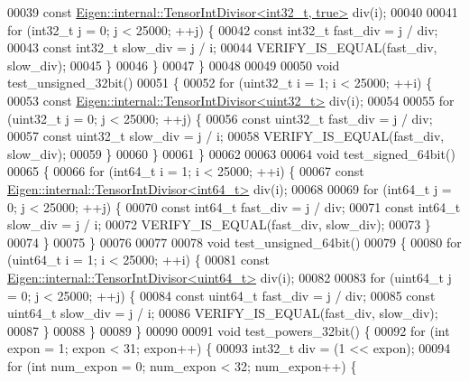 \begin{DoxyCode}
00039     \textcolor{keyword}{const} \hyperlink{class_eigen_1_1internal_1_1_tensor_int_divisor_3_01int32__t_00_01true_01_4}{Eigen::internal::TensorIntDivisor<int32\_t, true>} 
      div(i);
00040 
00041     \textcolor{keywordflow}{for} (int32\_t j = 0; j < 25000; ++j) \{
00042       \textcolor{keyword}{const} int32\_t fast\_div = j / div;
00043       \textcolor{keyword}{const} int32\_t slow\_div = j / i;
00044       VERIFY\_IS\_EQUAL(fast\_div, slow\_div);
00045     \}
00046   \}
00047 \}
00048 
00049 
00050 \textcolor{keywordtype}{void} test\_unsigned\_32bit()
00051 \{
00052   \textcolor{keywordflow}{for} (uint32\_t i = 1; i < 25000; ++i) \{
00053     \textcolor{keyword}{const} \hyperlink{struct_eigen_1_1internal_1_1_tensor_int_divisor}{Eigen::internal::TensorIntDivisor<uint32\_t>} div(i);
00054 
00055     \textcolor{keywordflow}{for} (uint32\_t j = 0; j < 25000; ++j) \{
00056       \textcolor{keyword}{const} uint32\_t fast\_div = j / div;
00057       \textcolor{keyword}{const} uint32\_t slow\_div = j / i;
00058       VERIFY\_IS\_EQUAL(fast\_div, slow\_div);
00059     \}
00060   \}
00061 \}
00062 
00063 
00064 \textcolor{keywordtype}{void} test\_signed\_64bit()
00065 \{
00066   \textcolor{keywordflow}{for} (int64\_t i = 1; i < 25000; ++i) \{
00067     \textcolor{keyword}{const} \hyperlink{struct_eigen_1_1internal_1_1_tensor_int_divisor}{Eigen::internal::TensorIntDivisor<int64\_t>} div(i);
00068 
00069     \textcolor{keywordflow}{for} (int64\_t j = 0; j < 25000; ++j) \{
00070       \textcolor{keyword}{const} int64\_t fast\_div = j / div;
00071       \textcolor{keyword}{const} int64\_t slow\_div = j / i;
00072       VERIFY\_IS\_EQUAL(fast\_div, slow\_div);
00073     \}
00074   \}
00075 \}
00076 
00077 
00078 \textcolor{keywordtype}{void} test\_unsigned\_64bit()
00079 \{
00080   \textcolor{keywordflow}{for} (uint64\_t i = 1; i < 25000; ++i) \{
00081     \textcolor{keyword}{const} \hyperlink{struct_eigen_1_1internal_1_1_tensor_int_divisor}{Eigen::internal::TensorIntDivisor<uint64\_t>} div(i);
00082 
00083     \textcolor{keywordflow}{for} (uint64\_t j = 0; j < 25000; ++j) \{
00084       \textcolor{keyword}{const} uint64\_t fast\_div = j / div;
00085       \textcolor{keyword}{const} uint64\_t slow\_div = j / i;
00086       VERIFY\_IS\_EQUAL(fast\_div, slow\_div);
00087     \}
00088   \}
00089 \}
00090 
00091 \textcolor{keywordtype}{void} test\_powers\_32bit() \{
00092   \textcolor{keywordflow}{for} (\textcolor{keywordtype}{int} expon = 1; expon < 31; expon++) \{
00093     int32\_t div = (1 << expon);
00094     \textcolor{keywordflow}{for} (\textcolor{keywordtype}{int} num\_expon = 0; num\_expon < 32; num\_expon++) \{

\end{DoxyCode}
